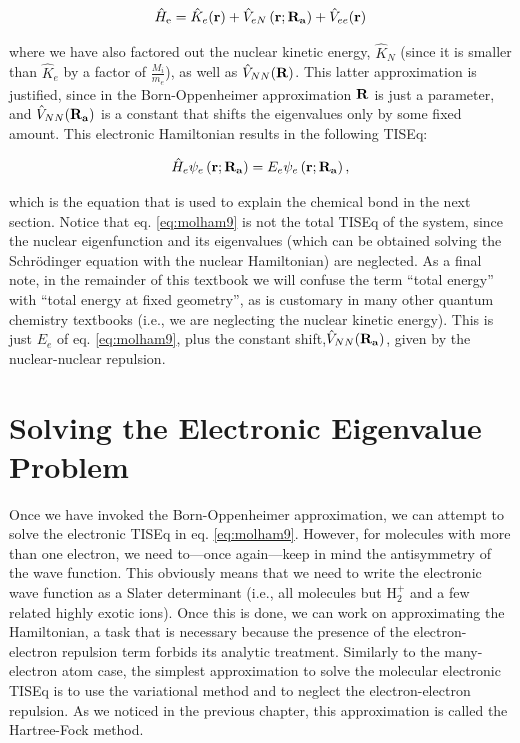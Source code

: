 \documentclass[
  9pt,
]{extbook}
\theoremstyle{definition}
\theoremstyle{definition}
\theoremstyle{definition}
\theoremstyle{remark}
\begin{document}
\begin{equation}
\hat{H}_{\text{e}} = \hat{K}_e({\bf r}) +
\hat{V}_{eN}\left({\bf r}; {\bf R_a} \right) +
\hat{V}_{ee}({\bf r})
\label{eq:molham8}
\end{equation}

where we have also factored out the nuclear kinetic energy, \(\hat{K}_N\) (since it is smaller than \(\hat{K}_e\) by a factor of \(\frac{M_i}{m_e}\)), as well as \(\hat{V}_{NN}({\bf R})\). This latter approximation is justified, since in the Born-Oppenheimer approximation \({\bf R}\) is just a parameter, and \(\hat{V}_{NN}({\bf R_a})\) is a constant that shifts the eigenvalues only by some fixed amount. This electronic Hamiltonian results in the following TISEq:

\begin{equation}
\hat{H}_{e} \psi_e \left({\bf r}; {\bf R_a} \right) = E_{e} \psi_e \left({\bf r}; {\bf R_a} \right),
\label{eq:molham9}
\end{equation}

which is the equation that is used to explain the chemical bond in the next section. Notice that eq. \eqref{eq:molham9} is not the total TISEq of the system, since the nuclear eigenfunction and its eigenvalues (which can be obtained solving the Schrödinger equation with the nuclear Hamiltonian) are neglected.
As a final note, in the remainder of this textbook we will confuse the term ``total energy'' with ``total energy at fixed geometry'', as is customary in many other quantum chemistry textbooks (i.e., we are neglecting the nuclear kinetic energy). This is just \(E_{e}\) of eq. \eqref{eq:molham9}, plus the constant shift,\(\hat{V}_{NN}({\bf R_a})\), given by the nuclear-nuclear repulsion.

\hypertarget{solving-the-electronic-eigenvalue-problem}{%
\section{Solving the Electronic Eigenvalue Problem}\label{solving-the-electronic-eigenvalue-problem}}

Once we have invoked the Born-Oppenheimer approximation, we can attempt to solve the electronic TISEq in eq. \eqref{eq:molham9}. However, for molecules with more than one electron, we need to---once again---keep in mind the antisymmetry of the wave function. This obviously means that we need to write the electronic wave function as a Slater determinant (i.e., all molecules but \(\mathrm{H}_2^+\) and a few related highly exotic ions). Once this is done, we can work on approximating the Hamiltonian, a task that is necessary because the presence of the electron-electron repulsion term forbids its analytic treatment. Similarly to the many-electron atom case, the simplest approximation to solve the molecular electronic TISEq is to use the variational method and to neglect the electron-electron repulsion. As we noticed in the previous chapter, this approximation is called the Hartree-Fock method.
\end{document}

